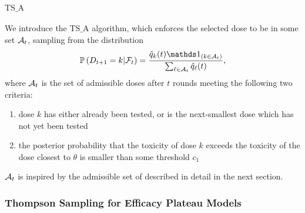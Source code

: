 \paragraph{$\bm{\mathrm{TS}\_\mathrm{A}}$} We introduce the $\mathrm{TS}\_\mathrm{A}$ algorithm, which enforces the selected dose to be in some set $\mathcal{A}_t$, sampling from the distribution 
\[\bP\left(D_{t+1} = k | \cF_{t}\right) = \frac{\hat{q}_k(t) \ind_{\left(k \in \cA_t\right)}}{\sum_{\ell \in \cA_t} \hat{q}_{\ell}(t)},\] where $\mathcal{A}_t$ is the set of admissible doses after $t$ rounds meeting the following two criteria:
\begin{enumerate}
    \item dose $k$ has either already been tested, or is the next-smallest dose which has not yet been tested    
    \item the posterior probability that the toxicity of dose $k$ exceeds the toxicity of the dose closest to $\theta$ is smaller than some threshold $c_1$ 
%
\end{enumerate}
$\mathcal{A}_t$ is inspired by the admissible set of \cite{MKR17} described in detail in the next section.


\subsubsection{Thompson Sampling for Efficacy Plateau Models}\label{sec:TSEff}



